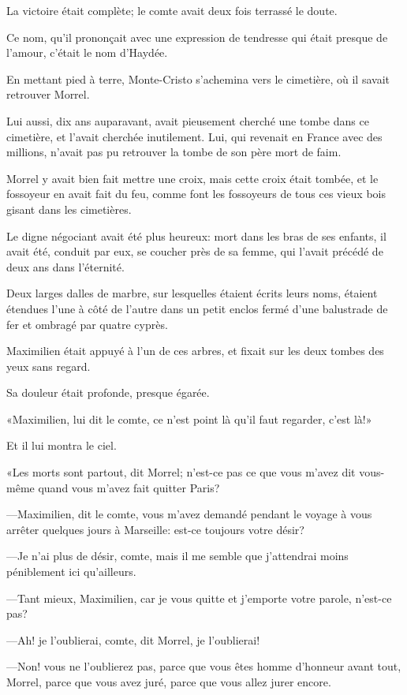 La victoire était complète; le comte avait deux fois terrassé le doute. 

Ce nom, qu'il prononçait avec une expression de tendresse qui était presque de l'amour, c'était le nom d'Haydée. 

En mettant pied à terre, Monte-Cristo s'achemina vers le cimetière, où il savait retrouver Morrel. 

Lui aussi, dix ans auparavant, avait pieusement cherché une tombe dans ce cimetière, et l'avait cherchée inutilement. Lui, qui revenait en France avec des millions, n'avait pas pu retrouver la tombe de son père mort de faim. 

Morrel y avait bien fait mettre une croix, mais cette croix était tombée, et le fossoyeur en avait fait du feu, comme font les fossoyeurs de tous ces vieux bois gisant dans les cimetières. 

Le digne négociant avait été plus heureux: mort dans les bras de ses enfants, il avait été, conduit par eux, se coucher près de sa femme, qui l'avait précédé de deux ans dans l'éternité. 

Deux larges dalles de marbre, sur lesquelles étaient écrits leurs noms, étaient étendues l'une à côté de l'autre dans un petit enclos fermé d'une balustrade de fer et ombragé par quatre cyprès. 

Maximilien était appuyé à l'un de ces arbres, et fixait sur les deux tombes des yeux sans regard. 

Sa douleur était profonde, presque égarée. 

«Maximilien, lui dit le comte, ce n'est point là qu'il faut regarder, c'est là!» 

Et il lui montra le ciel. 

«Les morts sont partout, dit Morrel; n'est-ce pas ce que vous m'avez dit vous-même quand vous m'avez fait quitter Paris? 

—Maximilien, dit le comte, vous m'avez demandé pendant le voyage à vous arrêter quelques jours à Marseille: est-ce toujours votre désir? 

—Je n'ai plus de désir, comte, mais il me semble que j'attendrai moins péniblement ici qu'ailleurs. 

—Tant mieux, Maximilien, car je vous quitte et j'emporte votre parole, n'est-ce pas? 

—Ah! je l'oublierai, comte, dit Morrel, je l'oublierai! 

—Non! vous ne l'oublierez pas, parce que vous êtes homme d'honneur avant tout, Morrel, parce que vous avez juré, parce que vous allez jurer encore. 

